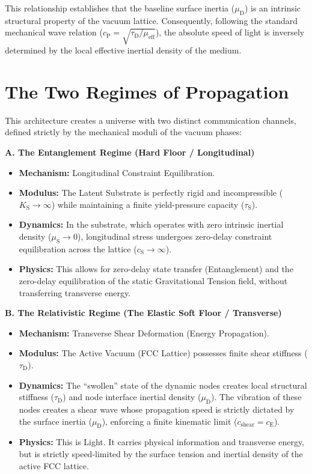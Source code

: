 This relationship establishes that the baseline surface inertia ($\mu_{\mathrm{D}}$) is an intrinsic structural property of the vacuum lattice. Consequently, following the standard mechanical wave relation ($c_{\mathrm{P}} = \sqrt{\tau_{\mathrm{D}} / \mu_{\mathrm{eff}}}$), the absolute speed of light is inversely determined by the local effective inertial density of the medium.

\section{The Two Regimes of Propagation}
This architecture creates a universe with two distinct communication channels, defined strictly by the mechanical moduli of the vacuum phases:

\vspace{0.3em}
\noindent\textbf{A. The Entanglement Regime (Hard Floor / Longitudinal)}
\begin{itemize}
    \item \textbf{Mechanism:} Longitudinal Constraint Equilibration.
    \item \textbf{Modulus:} The Latent Substrate is perfectly rigid and incompressible ($K_{\mathrm{S}} \to \infty$) while maintaining a finite yield-pressure capacity ($\tau_{\mathrm{S}}$).
    \item \textbf{Dynamics:} In the substrate, which operates with zero intrinsic inertial density ($\mu_{\mathrm{S}} \to 0$), longitudinal stress undergoes zero-delay constraint equilibration across the lattice ($c_{\mathrm{S}} \to \infty$).
    \item \textbf{Physics:} This allows for zero-delay state transfer (Entanglement) and the zero-delay equilibration of the static Gravitational Tension field, without transferring transverse energy.
\end{itemize}

\vspace{0.3em}
\noindent\textbf{B. The Relativistic Regime (The Elastic Soft Floor / Transverse)}
\begin{itemize}
    \item \textbf{Mechanism:} Transverse Shear Deformation (Energy Propagation).
    \item \textbf{Modulus:} The Active Vacuum (FCC Lattice) possesses finite shear stiffness ($\tau_{\mathrm{D}}$).
    \item \textbf{Dynamics:} The ``swollen'' state of the dynamic nodes creates local structural stiffness ($\tau_{\mathrm{D}}$) and node interface inertial density ($\mu_{\mathrm{D}}$). The vibration of these nodes creates a shear wave whose propagation speed is strictly dictated by the surface inertia ($\mu_{\mathrm{D}}$), enforcing a finite kinematic limit ($c_{\mathrm{shear}} = c_{\mathrm{E}}$).
    \item \textbf{Physics:} This is Light. It carries physical information and transverse energy, but is strictly speed-limited by the surface tension and inertial density of the active FCC lattice.
\end{itemize}

